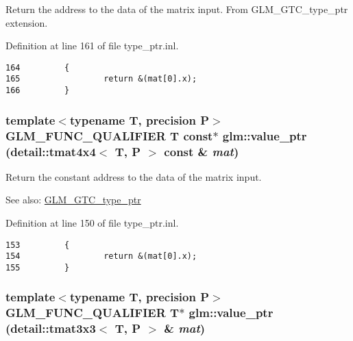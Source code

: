 Return the address to the data of the matrix input. From GLM\_\-GTC\_\-type\_\-ptr extension. 

Definition at line 161 of file type\_\-ptr.inl.

\begin{Code}\begin{verbatim}164         {
165                 return &(mat[0].x);
166         }
\end{verbatim}
\end{Code}


\hypertarget{group__gtc__type__ptr_gcb2a7024434ab32998c6ade8ec0c0e4b}{
\subsubsection[value\_\-ptr]{\setlength{\rightskip}{0pt plus 5cm}template$<$typename T, precision P$>$ GLM\_\-FUNC\_\-QUALIFIER T const$\ast$ glm::value\_\-ptr (detail::tmat4x4$<$ T, P $>$ const \& {\em mat})}}
\label{group__gtc__type__ptr_gcb2a7024434ab32998c6ade8ec0c0e4b}


Return the constant address to the data of the matrix input. \begin{Desc}
\item[See also:]\hyperlink{group__gtc__type__ptr}{GLM\_\-GTC\_\-type\_\-ptr} \end{Desc}


Definition at line 150 of file type\_\-ptr.inl.

\begin{Code}\begin{verbatim}153         {
154                 return &(mat[0].x);
155         }
\end{verbatim}
\end{Code}


\hypertarget{group__gtc__type__ptr_ge90c54e1a61d5ad0417d3c1a7800dfdc}{
\subsubsection[value\_\-ptr]{\setlength{\rightskip}{0pt plus 5cm}template$<$typename T, precision P$>$ GLM\_\-FUNC\_\-QUALIFIER T$\ast$ glm::value\_\-ptr (detail::tmat3x3$<$ T, P $>$ \& {\em mat})}}
\label{group__gtc__type__ptr_ge90c54e1a61d5ad0417d3c1a7800dfdc}


